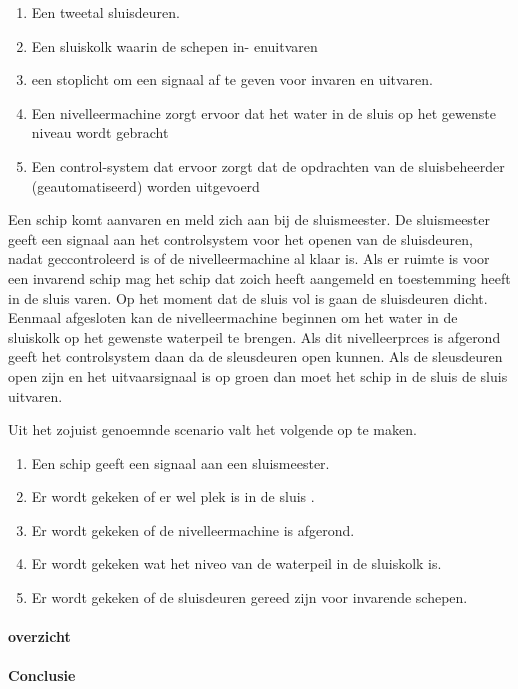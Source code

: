 \begin{enumerate}
	\item Een tweetal sluisdeuren. 
	\item Een sluiskolk waarin de schepen in- enuitvaren
	\item een stoplicht om een signaal af te geven voor invaren en uitvaren.
	\item Een nivelleermachine zorgt ervoor dat het water in de sluis op het gewenste niveau wordt gebracht
	\item Een control-system dat ervoor zorgt dat de opdrachten van de sluisbeheerder (geautomatiseerd) worden uitgevoerd
\end{enumerate}

Een schip komt aanvaren en meld zich aan bij de sluismeester. De sluismeester geeft een signaal aan het controlsystem voor het openen van de sluisdeuren, nadat geccontroleerd is of de nivelleermachine al klaar is. Als er ruimte is voor een invarend schip mag het schip dat zoich heeft aangemeld en toestemming heeft  in de sluis varen. Op het moment dat de sluis vol is gaan de sluisdeuren dicht. Eenmaal afgesloten kan de nivelleermachine beginnen om het water in de sluiskolk op het gewenste waterpeil te brengen. Als dit nivelleerprces is afgerond geeft  het controlsystem daan da de sleusdeuren open kunnen.  Als de sleusdeuren open zijn en het uitvaarsignaal is op groen dan moet het schip in de sluis de sluis uitvaren.

Uit het zojuist genoemnde scenario valt het volgende op te maken.
\begin{enumerate}
	\item Een schip geeft een signaal aan een sluismeester.
	\item Er wordt gekeken of er wel plek is in de sluis .
	\item Er wordt gekeken of de nivelleermachine is afgerond.
	\item Er wordt gekeken wat het niveo van de waterpeil in de sluiskolk is.
	\item Er wordt gekeken of de sluisdeuren gereed zijn voor invarende schepen.
\end{enumerate}

\paragraph{overzicht}

\paragraph{Conclusie}

